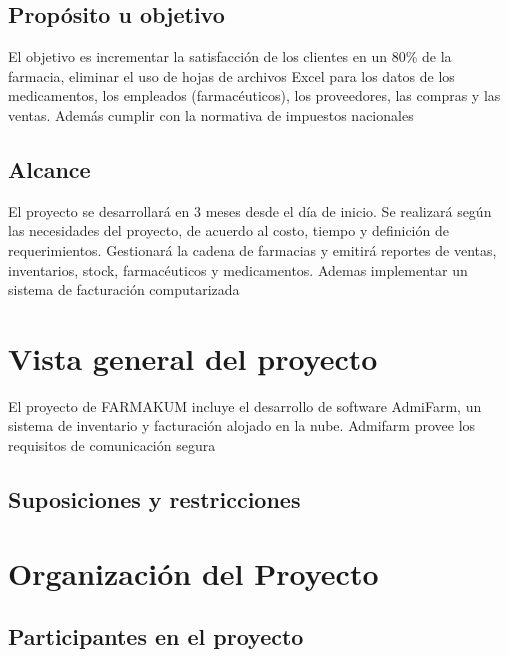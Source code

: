 \section{Propósito u objetivo}
El objetivo es incrementar la satisfacción de los clientes en un 80\% de la farmacia, eliminar el uso de hojas de archivos Excel para los datos de los medicamentos, los empleados (farmacéuticos), los proveedores, las compras y las ventas. Además cumplir con la normativa de impuestos nacionales
\section{Alcance}
El proyecto se desarrollará en 3 meses desde el día de inicio. Se realizará según las necesidades del proyecto, de acuerdo al costo,  tiempo y definición de requerimientos. Gestionará la cadena de farmacias y emitirá reportes de ventas, inventarios, stock, farmacéuticos y medicamentos\cite{ahmed_software_2012}.  Ademas implementar un sistema de facturación computarizada



\chapter*{Vista general del proyecto}
El proyecto de FARMAKUM incluye el desarrollo de software AdmiFarm, un sistema de inventario y facturación alojado en la nube. Admifarm provee los requisitos de comunicación segura

\section{Suposiciones y restricciones}

\chapter*{Organización del Proyecto}
\section{Participantes en el proyecto}

